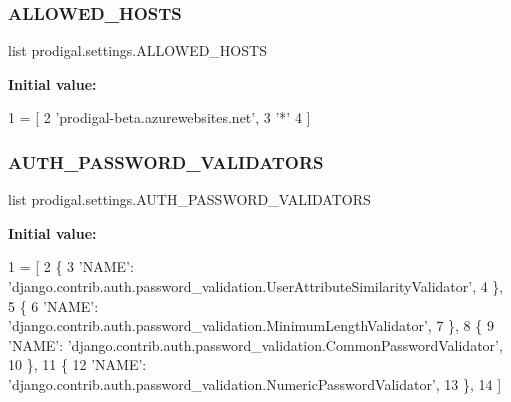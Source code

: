 \subsubsection{\texorpdfstring{A\+L\+L\+O\+W\+E\+D\+\_\+\+H\+O\+S\+TS}{ALLOWED\_HOSTS}}
{\footnotesize\ttfamily list prodigal.\+settings.\+A\+L\+L\+O\+W\+E\+D\+\_\+\+H\+O\+S\+TS}

{\bfseries Initial value\+:}
\begin{DoxyCode}
1 =  [
2     \textcolor{stringliteral}{'prodigal-beta.azurewebsites.net'},         
3     \textcolor{stringliteral}{'*'}
4 ]
\end{DoxyCode}
\mbox{\label{namespaceprodigal_1_1settings_a040fb2eb1a49a84c912cf211adfbe9b8}} 
\subsubsection{\texorpdfstring{A\+U\+T\+H\+\_\+\+P\+A\+S\+S\+W\+O\+R\+D\+\_\+\+V\+A\+L\+I\+D\+A\+T\+O\+RS}{AUTH\_PASSWORD\_VALIDATORS}}
{\footnotesize\ttfamily list prodigal.\+settings.\+A\+U\+T\+H\+\_\+\+P\+A\+S\+S\+W\+O\+R\+D\+\_\+\+V\+A\+L\+I\+D\+A\+T\+O\+RS}

{\bfseries Initial value\+:}
\begin{DoxyCode}
1 =  [
2     \{
3         \textcolor{stringliteral}{'NAME'}: \textcolor{stringliteral}{'django.contrib.auth.password\_validation.UserAttributeSimilarityValidator'},
4     \},
5     \{
6         \textcolor{stringliteral}{'NAME'}: \textcolor{stringliteral}{'django.contrib.auth.password\_validation.MinimumLengthValidator'},
7     \},
8     \{
9         \textcolor{stringliteral}{'NAME'}: \textcolor{stringliteral}{'django.contrib.auth.password\_validation.CommonPasswordValidator'},
10     \},
11     \{
12         \textcolor{stringliteral}{'NAME'}: \textcolor{stringliteral}{'django.contrib.auth.password\_validation.NumericPasswordValidator'},
13     \},
14 ]
\end{DoxyCode}
\mbox{\label{namespaceprodigal_1_1settings_a46d5c0adc73fea276379de1edf55ed2d}} 
